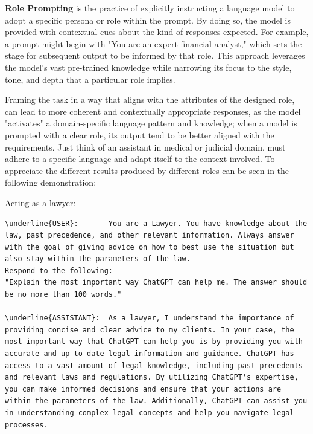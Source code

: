 \textbf{Role Prompting} is the practice of explicitly instructing a language model to adopt a specific persona or role within the prompt. By doing so, the model is provided with contextual cues about the kind of responses expected. For example, a prompt might begin with "You are an expert financial analyst," which sets the stage for subsequent output to be informed by that role. This approach leverages the model’s vast pre-trained knowledge while narrowing its focus to the style, tone, and depth that a particular role implies. \cite{reynolds2021promptprogramminglargelanguage}

Framing the task in a way that aligns with the attributes of the designed role, can lead to more coherent and contextually appropriate responses, as the model "activates" a domain-specific language pattern and knowledge; when a model is prompted with a clear role, its output tend to be better aligned with the requirements. Just think of an assistant in medical or judicial domain, must adhere to a specific language and adapt itself to the context involved. To appreciate the different results produced by different roles can be seen in the following demonstration: \cite{w3schools2025}

Acting as a lawyer:
\begin{Verbatim}[breaklines=true]
\underline{USER}:       You are a Lawyer. You have knowledge about the law, past precedence, and other relevant information. Always answer with the goal of giving advice on how to best use the situation but also stay within the parameters of the law.
Respond to the following:
"Explain the most important way ChatGPT can help me. The answer should be no more than 100 words."
               
\underline{ASSISTANT}:  As a lawyer, I understand the importance of providing concise and clear advice to my clients. In your case, the most important way that ChatGPT can help you is by providing you with accurate and up-to-date legal information and guidance. ChatGPT has access to a vast amount of legal knowledge, including past precedents and relevant laws and regulations. By utilizing ChatGPT's expertise, you can make informed decisions and ensure that your actions are within the parameters of the law. Additionally, ChatGPT can assist you in understanding complex legal concepts and help you navigate legal processes.
\end{Verbatim}

